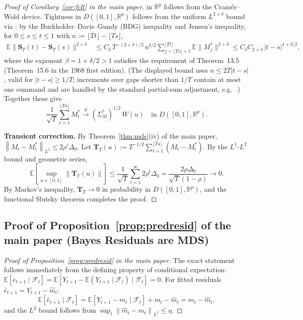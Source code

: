 \documentclass[bj,authoryear]{imsart}
\theoremstyle{plain}
\theoremstyle{definition}
\newcommand{\E}{\mathbb{E}}
\newcommand{\R}{\mathbb{R}}
\newcommand{\F}{\mathcal{F}}
\newcommand{\norm}[1]{\left\lVert #1 \right\rVert}
\newcommand{\given}{\mid}
\begin{document}
\begin{proof}[Proof of Corollary~\ref{cor:fclt} in the main paper]
  in $\R^p$ follows from the Cram\'er--Wold device.
  Tightness in $D([0,1],\R^p)$ follows from the uniform $L^{2+\delta}$ bound
  via \citet[Theorem~13.5]{billingsley1999convergence}: by the
  Burkholder--Davis--Gundy (BDG) inequality and Jensen's inequality,
  for $0\leq s\leq t\leq 1$ with $n:=\lfloor Tt\rfloor-\lfloor Ts\rfloor$,
  \begin{align*}
    \E\|\mathbf{S}_T(t)-\mathbf{S}_T(s)\|^{2+\delta}
    &\leq C_\delta\,T^{-(2+\delta)/2}\,n^{\delta/2}
        \sum_{j=\lfloor Ts\rfloor+1}^{\lfloor Tt\rfloor}\E\|M_j^*\|^{2+\delta}
    \leq C_\delta C_{2+\delta}\,|t-s|^{1+\delta/2},
  \end{align*}
  where the exponent $\beta = 1 + \delta/2 > 1$ satisfies the requirement
  of Theorem~13.5 (Theorem~15.6 in the 1968 first edition).
  (The displayed bound uses $n\leq 2T|t-s|$, valid for $|t-s|\geq 1/T$;
  increments over gaps shorter than $1/T$ contain at most one summand and
  are handled by the standard partial-sum adjustment, e.g.\
  \citealt[Sec.~13]{billingsley1999convergence}.)  Together these give
  \[
    \frac{1}{\sqrt{T}}\sum_{t=1}^{\lfloor Tu\rfloor} M_t^*
    \xrightarrow{d} (\Sigma_M^*)^{1/2}\,W(u)
    \quad\text{in }D([0,1],\R^p).
  \]

  \textbf{Transient correction.}
  By Theorem~\ref{thm:mds}(iv) of the main paper,
  $\norm{M_t - M_t^*}_{L^2} \leq 2\rho^t\Delta_0$.
  Let $\mathbf{T}_T(u) := T^{-1/2}\sum_{t=1}^{\lfloor Tu\rfloor}(M_t - M_t^*)$.
  By the $L^1$-$L^2$ bound and geometric series,
  \[
    \E\!\left[\sup_{u\in[0,1]}\norm{\mathbf{T}_T(u)}\right]
    \leq \frac{1}{\sqrt{T}}\sum_{t=1}^{\infty}2\rho^t\Delta_0
    = \frac{2\rho\Delta_0}{\sqrt{T}(1-\rho)} \to 0.
  \]
  By Markov's inequality, $\mathbf{T}_T \to 0$ in probability in $D([0,1],\R^p)$,
  and the functional Slutsky theorem completes the proof.
\end{proof}

\subsection{Proof of Proposition~\ref{prop:predresid} of the main paper (Bayes Residuals are MDS)}
\label{app:proof-propresid}

\begin{proof}[Proof of Proposition~\ref{prop:predresid} in the main paper]
  The exact statement follows immediately from the defining property of
  conditional expectation:
  $\E[e_{t+1}\given\F_t]
    = \E[Y_{t+1} - \E(Y_{t+1}\mid\F_t)\mid\F_t] = 0$.
  For fitted residuals $\hat{e}_{t+1} = Y_{t+1} - \hat{m}_t$:
  \[
    \E[\hat{e}_{t+1}\mid\F_t]
    = \E[Y_{t+1} - m_t\mid\F_t] + m_t - \hat{m}_t
    = m_t - \hat{m}_t,
  \]
  and the $L^2$ bound follows from $\sup_t\norm{\hat{m}_t - m_t}_{L^2} \leq \eta$.
\end{proof}
\end{document}
